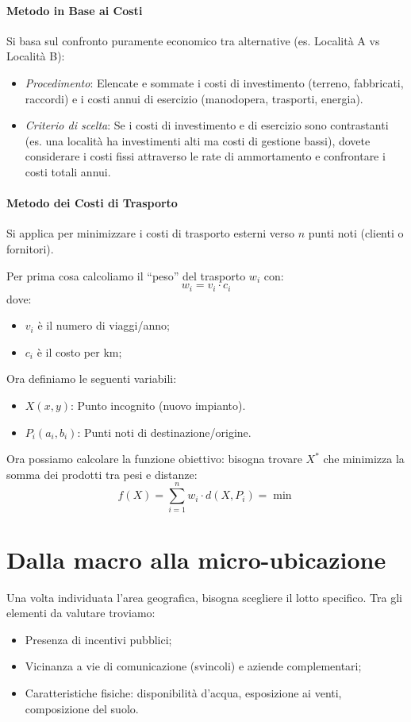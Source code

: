 \paragraph{Metodo in Base ai Costi} Si basa sul confronto puramente economico tra alternative (es. Località A vs Località B):
\begin{itemize}
    \item \emph{Procedimento}: Elencate e sommate i costi di investimento (terreno, fabbricati, raccordi) e i costi annui di esercizio (manodopera, trasporti, energia).
    \item \emph{Criterio di scelta}: Se i costi di investimento e di esercizio sono contrastanti (es. una località ha investimenti alti ma costi di gestione bassi), dovete considerare i costi fissi attraverso le rate di ammortamento e confrontare i costi totali annui.
\end{itemize}
%
\paragraph{Metodo dei Costi di Trasporto} Si applica per minimizzare i costi di trasporto esterni verso $n$ punti noti (clienti o fornitori).

Per prima cosa calcoliamo il ``peso'' del trasporto $ w_{i} $ con:
\[
    w_{i}=v_{i} \cdot c_{i}
\]
dove:
\begin{itemize}
    \item $ v_{i} $ è il numero di viaggi/anno;
    \item $ c_{i} $ è il costo per km;
\end{itemize}

Ora definiamo le seguenti variabili:
\begin{itemize}
    \item $X(x,y)$: Punto incognito (nuovo impianto).
    \item $P_{i}(a_{i},b_{i})$: Punti noti di destinazione/origine.
\end{itemize}
Ora possiamo calcolare la funzione obiettivo: bisogna trovare $X^*$ che minimizza la somma dei prodotti tra pesi e distanze:
\[
    f(X) = \sum_{i=1}^{n}w_{i} \cdot d(X,P_{i}) = \min
\]

%
\section{Dalla macro alla micro-ubicazione}
Una volta individuata l'area geografica, bisogna scegliere il lotto specifico.
Tra gli elementi da valutare troviamo:
\begin{itemize}
    \item Presenza di incentivi pubblici;
    \item Vicinanza a vie di comunicazione (svincoli) e aziende complementari;
    \item Caratteristiche fisiche: disponibilità d'acqua, esposizione ai venti, composizione del suolo.
\end{itemize}
%
